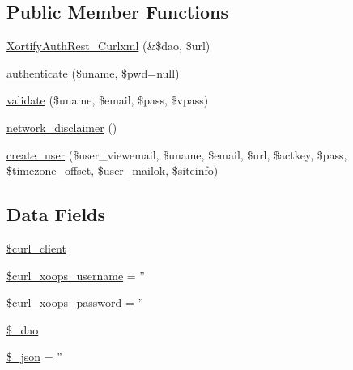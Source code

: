 \subsection*{Public Member Functions}
\begin{DoxyCompactItemize}
\item 
\hyperlink{class_xortify_auth_rest___curlxml_a923afe8097b328b00be4a03f7f8ec4b8}{Xortify\-Auth\-Rest\-\_\-\-Curlxml} (\&\$dao, \$url)
\item 
\hyperlink{class_xortify_auth_rest___curlxml_a00678ba307326b734e6c679f28bea315}{authenticate} (\$uname, \$pwd=null)
\item 
\hyperlink{class_xortify_auth_rest___curlxml_a91121a1b702dfd20fb65a027c8ed26ec}{validate} (\$uname, \$email, \$pass, \$vpass)
\item 
\hyperlink{class_xortify_auth_rest___curlxml_a1874c27b6f81a3f2ff9015405ad0f8bc}{network\-\_\-disclaimer} ()
\item 
\hyperlink{class_xortify_auth_rest___curlxml_ac72efc5ad313a592cf6706876f56f7ec}{create\-\_\-user} (\$user\-\_\-viewemail, \$uname, \$email, \$url, \$actkey, \$pass, \$timezone\-\_\-offset, \$user\-\_\-mailok, \$siteinfo)
\end{DoxyCompactItemize}
\subsection*{Data Fields}
\begin{DoxyCompactItemize}
\item 
\hyperlink{class_xortify_auth_rest___curlxml_a402f2112991f3227835af80e9df33e38}{\$curl\-\_\-client}
\item 
\hyperlink{class_xortify_auth_rest___curlxml_aab7480ba9f878a02b2c9fd43922fa070}{\$curl\-\_\-xoops\-\_\-username} = ''
\item 
\hyperlink{class_xortify_auth_rest___curlxml_a6c9851541ed3826c67cfe7224c38f0b8}{\$curl\-\_\-xoops\-\_\-password} = ''
\item 
\hyperlink{class_xortify_auth_rest___curlxml_a12a029c610f699b4b25e79a1f64a3485}{\$\-\_\-dao}
\item 
\hyperlink{class_xortify_auth_rest___curlxml_a94787b37d92a2dee02534eed4f316589}{\$\-\_\-json} = ''
\end{DoxyCompactItemize}


